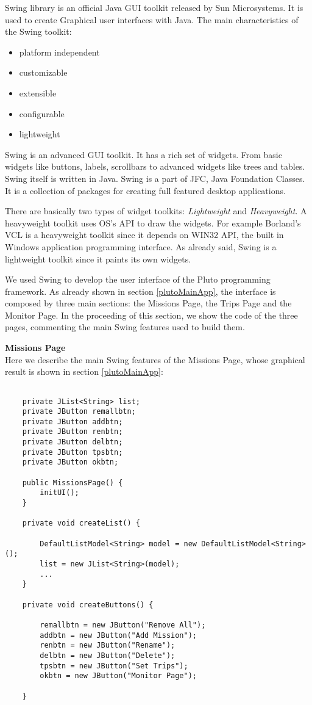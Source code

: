 Swing library is an official Java GUI toolkit released by Sun Microsystems. It is used to create Graphical user interfaces with Java.
The main characteristics of the Swing toolkit:
\begin{itemize}
\item platform independent
\item customizable
\item extensible
\item configurable
\item lightweight
\end{itemize}

Swing is an advanced GUI toolkit. It has a rich set of widgets. From basic widgets like buttons, labels, scrollbars to advanced widgets like trees and tables. Swing itself is written in Java.
Swing is a part of JFC, Java Foundation Classes. It is a collection of packages for creating full featured desktop applications.

There are basically two types of widget toolkits: \textit{Lightweight} and \textit{Heavyweight}.
A heavyweight toolkit uses OS's API to draw the widgets. For example Borland's VCL is a heavyweight toolkit since it depends on WIN32 API, the built in Windows application programming interface.
As already said, Swing is a lightweight toolkit since it paints its own widgets.

We used Swing to develop the user interface of the Pluto programming framework.
As already shown in section \ref{plutoMainApp}, the interface is composed by three main sections: the Missions Page, the Trips Page and the Monitor Page.
In the proceeding of this section, we show the code of the three pages, commenting the main Swing features used to build them.
\newpage

\textbf{Missions Page}
\\

Here we describe the main Swing features of the Missions Page, whose graphical result is shown in section \ref{plutoMainApp}:

\begin{lstlisting}

	private JList<String> list;
	private JButton remallbtn;
	private JButton addbtn;
	private JButton renbtn;
	private JButton delbtn;
	private JButton tpsbtn;
	private JButton okbtn;

	public MissionsPage() {
		initUI();
	}

	private void createList() {

		DefaultListModel<String> model = new DefaultListModel<String>();
		list = new JList<String>(model);
		...
	}

	private void createButtons() {

		remallbtn = new JButton("Remove All");
		addbtn = new JButton("Add Mission");
		renbtn = new JButton("Rename");
		delbtn = new JButton("Delete");
		tpsbtn = new JButton("Set Trips");
		okbtn = new JButton("Monitor Page");

	}

\end{lstlisting}

